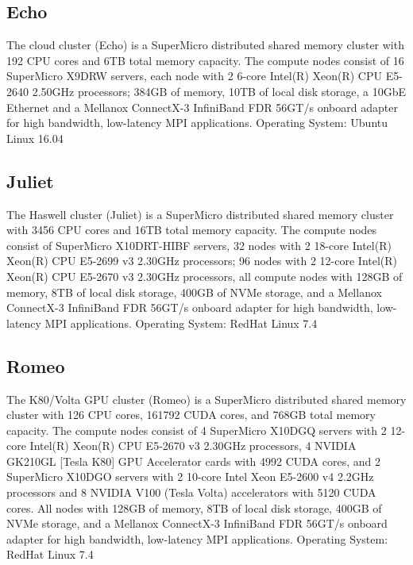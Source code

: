 \subsection{Echo}

The cloud cluster (Echo) is a SuperMicro distributed shared memory
cluster with 192 CPU cores and 6TB total memory capacity. The compute
nodes consist of 16 SuperMicro X9DRW servers, each node with 2 6-core
Intel(R) Xeon(R) CPU E5-2640 2.50GHz processors; 384GB of memory, 10TB
of local disk storage, a 10GbE Ethernet and a Mellanox ConnectX-3
InfiniBand FDR 56GT/s onboard adapter for high bandwidth, low-latency
MPI applications. Operating System: Ubuntu Linux 16.04

\subsection{Juliet}

The Haswell cluster (Juliet) is a SuperMicro distributed shared memory
cluster with 3456 CPU cores and 16TB total memory capacity. The
compute nodes consist of SuperMicro X10DRT-HIBF servers, 32 nodes with
2 18-core Intel(R) Xeon(R) CPU E5-2699 v3 2.30GHz processors; 96 nodes
with 2 12-core Intel(R) Xeon(R) CPU E5-2670 v3 2.30GHz processors, all
compute nodes with 128GB of memory, 8TB of local disk storage, 400GB
of NVMe storage, and a Mellanox ConnectX-3 InfiniBand FDR 56GT/s
onboard adapter for high bandwidth, low-latency MPI
applications. Operating System: RedHat Linux 7.4

\subsection{Romeo}

The K80/Volta GPU cluster (Romeo) is a SuperMicro distributed shared
memory cluster with 126 CPU cores, 161792 CUDA cores, and 768GB total
memory capacity. The compute nodes consist of 4 SuperMicro X10DGQ
servers with 2 12-core Intel(R) Xeon(R) CPU E5-2670 v3 2.30GHz
processors, 4 NVIDIA GK210GL [Tesla K80] GPU Accelerator cards with
4992 CUDA cores, and 2 SuperMicro X10DGO servers with 2 10-core Intel
Xeon E5-2600 v4 2.2GHz processors and 8 NVIDIA V100 (Tesla Volta)
accelerators with 5120 CUDA cores. All nodes with 128GB of memory, 8TB
of local disk storage, 400GB of NVMe storage, and a Mellanox
ConnectX-3 InfiniBand FDR 56GT/s onboard adapter for high bandwidth,
low-latency MPI applications. Operating System: RedHat Linux 7.4

